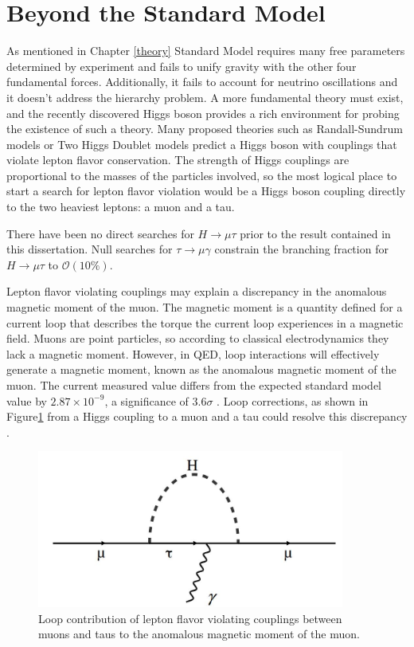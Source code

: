 \documentclass[oneside, letterpaper, oldfontcommands]{memoir}
\begin{document}
\section{Beyond the Standard Model}\label{BSM}

\qquad As mentioned in Chapter \ref{theory} Standard Model requires many free parameters determined by experiment and fails to unify gravity with the other four fundamental forces. Additionally, it fails to account for neutrino oscillations\cite{Fukuda:1998mi}\cite{Ahmad:2001an}\cite{Ahmad:2002jz} and it doesn't address the hierarchy problem. \cite{ArkaniHamed:1998rs} A more fundamental theory must exist, and the recently discovered Higgs boson provides a rich environment for probing the existence of such a theory. Many proposed theories such as Randall-Sundrum models \cite{Randall:1999ee} or Two Higgs Doublet models \cite{Branco:2011iw} predict a Higgs boson with couplings that violate lepton flavor conservation. The strength of Higgs couplings are proportional to the masses of the particles involved, so the most logical place to start a search for lepton flavor violation would be a Higgs boson coupling directly to the two heaviest leptons: a muon and a tau.

\qquad There have been no direct searches for $H \rightarrow \mu\tau$ prior to the result contained in this dissertation. Null searches for $\tau \rightarrow \mu\gamma$ constrain the branching fraction for $H \rightarrow \mu\tau$ to $\mathcal{O}(10\%)$.\cite{Harnik:2012pb}

\qquad Lepton flavor violating couplings may explain a discrepancy in the anomalous magnetic moment of the muon. The magnetic moment is a quantity defined for a current loop that describes the torque the current loop experiences in a magnetic field. Muons are point particles, so according to classical electrodynamics they lack a magnetic moment. However, in QED, loop interactions will effectively generate a magnetic moment, known as the anomalous magnetic moment of the muon. The current measured value differs from the expected standard model value by $2.87 \times 10^{-9}$, a significance of $3.6 \sigma$ \cite{Bennett:2004pv}\cite{Agashe:2014kda}. Loop corrections, as shown in Figure\ref{fig:mutauloop} from a Higgs coupling to a muon and a tau could resolve this discrepancy \cite{Harnik:2012pb}.

\begin{figure}[here]
\includegraphics[width=0.9\textwidth]{mutauloop.jpg}
\caption{Loop contribution of lepton flavor violating couplings between muons and taus to the anomalous magnetic moment of the muon.}
\label{fig:mutauloop}
\end{figure}
\end{document}

